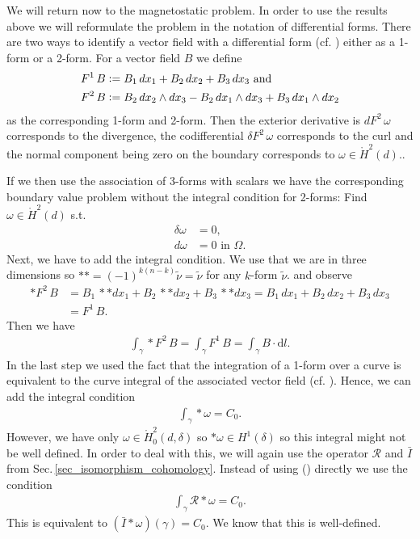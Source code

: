 \documentclass[12pt,a4paper]{article}
\theoremstyle{definition}
\newcommand{\rop}{\mathscr{R}} %
\begin{document}
We will return now to the magnetostatic problem. In order to use the results
above we will reformulate the problem in the notation of differential forms.
There are two ways to identify a vector field with a differential form 
(cf. \cite[Table 6.1 and p.70]{arnold}) either as a 1-form or a 2-form. 
For a vector field $B$ we define
\begin{align*}
    F^1\, B &\vcentcolon= B_1 \, dx_1 + B_2 \, dx_2 + B_3\, dx_3 \text{ and}\\
    F^2\, B &\vcentcolon= B_2 \, dx_2 \wedge dx_3 - B_2 \, dx_1 \wedge dx_3
        + B_3 \, dx_1 \wedge dx_2
\end{align*} 
as the corresponding 1-form and 2-form. 
Then the exterior derivative is $dF^2\,\omega$ corresponds to the divergence,
the codifferential $\delta F^2\,\omega$ 
corresponds to the curl and the normal component
being zero on the boundary corresponds 
to $\omega \in \mathring{H}^2(d)$.\cite{}. 

If we then use the association of
3-forms with scalars we have the corresponding boundary value problem without
the integral condition for 
2-forms: Find $\omega \in \mathring{H}^2(d)$ s.t.
\begin{align}
    \delta \omega &= 0, \\ 
    d\omega  &= 0 \text{ in } \Omega.
\end{align}
Next, we have to add the integral condition. 
We use that we are in three dimensions so
$**=(-1)^{k(n-k)}\tilde{\nu} = \tilde{\nu}$ \cite[p.66]{arnold} for any
$k$-form $\tilde{\nu}$.
and observe
\begin{align*}
    *F^2 \, B  &= B_1 \, **dx_1 + B_2 \, **dx_2 + B_3\, **dx_3 
        = B_1 \, dx_1 + B_2 \, dx_2 + B_3\, dx_3\\ 
    &= F^1 \, B.
\end{align*}
Then we have 
\begin{align*}
    \int_\gamma * F^2\, B = \int_\gamma F   ^1\, B = \int_\gamma B \cdot \text{d}l.
\end{align*}
In the last step we used the fact that the integration of a 1-form over a
curve is equivalent to the curve integral of the associated vector field
(cf. \cite[Sec. 6.2.3]{arnold}). Hence, we can add the integral condition 
\begin{align}
    \int_\gamma *\omega = C_0 \label{integral_condition}.
\end{align}
However, we have  only $\omega \in \mathring{H}_0^2(d,\delta)$ so 
$*\omega \in H^1(\delta)$ so this integral might not be well defined. In order 
to deal with this, we will again use the operator $\rop$ and $\bar{I}$ from 
Sec.\,\ref{sec_isomorphism_cohomology}. Instead of using 
() directly we use the condition 
\begin{align*}
    \int_\gamma \rop * \omega = C_0.
\end{align*}
This is equivalent to $(\bar{I}*\omega)(\gamma) = C_0$. We know that this is 
well-defined. 
\end{document}
